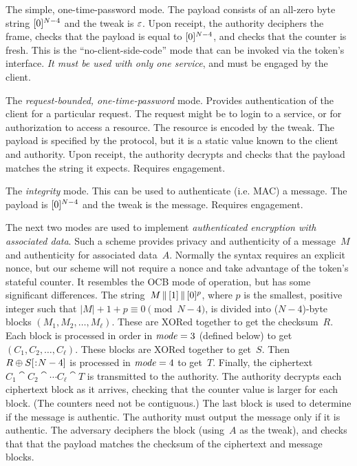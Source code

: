 %
The simple, one-time-password mode. The payload consists of an all-zero byte
string $\byte(0)^{N-4}$ and the tweak is $\varepsilon$. Upon receipt, the
authority deciphers the frame, checks that the payload is equal to
$\byte(0)^{N-4}$, and checks that the counter is fresh. This is the
``no-client-side-code'' mode that can be invoked via the token's 
interface. \emph{It must be used with only one service}, and must be engaged by
the client.

%
The \emph{request-bounded, one-time-password} mode. Provides authentication of the
client for a particular request. The request might be to login to a service, or
for authorization to access a resource. The resource is encoded by the tweak.
The payload is specified by the protocol, but it is a static value known to the
client and authority. Upon receipt, the authority decrypts and checks that the
payload matches the string it expects.
%
Requires engagement.

 The \emph{integrity} mode. This
can be used to authenticate (i.e. MAC) a message. The payload is
$\byte(0)^{N-4}$ and the tweak is the message.
%
Requires engagement.

The next two modes are used to implement \emph{authenticated encryption with
associated data}. Such a scheme provides privacy and authenticity of a
message~$M$ and authenticity for associated data~$A$. Normally the syntax
requires an explicit nonce, but our scheme will not require a nonce and take
advantage of the token's stateful counter. It resembles the OCB mode of
operation, but has some significant differences.
%
The string~$M\cat\byte(1)\cat\byte(0)^p$, where $p$ is the smallest, positive
integer such that $|M| + 1 + p \equiv 0 \pmod{N-4}$, is divided into
($N-4$)-byte blocks $(M_1, M_2, \ldots, M_\ell)$.  These are XORed together to
get the checksum~$R$.
%
Each block is processed in order in $\mathit{mode}=3$ (defined below) to get $(C_1, C_2,
\ldots, C_\ell)$. These blocks are XORed together to get~$S$. Then
$R \xor \substr(S,,N-4)$ is processed in $\mathit{mode}=4$ to get~$T$.  Finally, the
ciphertext $C_1 \cat C_2 \cat \cdots C_\ell \cat T$ is transmitted to the
authority.
%
The authority decrypts each ciphertext block as it arrives, checking that the
counter value is larger for each block. (The counters need not be contiguous.)
The last block is used to determine if the message is authentic. The authority
must output the message only if it is authentic. The adversary deciphers the
block (using~$A$ as the tweak), and checks that that the payload matches the
checksum of the ciphertext and message blocks.

